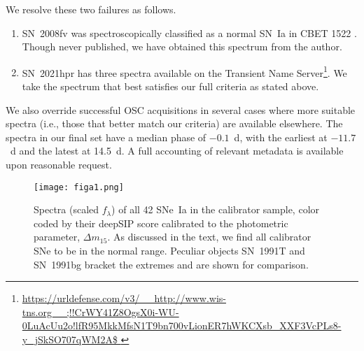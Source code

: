\documentclass[12pt]{aastex631}
\begin{document}
\begin{appendices}
We resolve these two failures as follows.
\begin{enumerate}
\item SN~2008fv was spectroscopically classified as a normal SN~Ia in CBET 1522 \citep{Challis:2008}. Though never published, we have obtained this spectrum from the author.
\item SN~2021hpr has three spectra available on the Transient Name Server\footnote{\url{https://urldefense.com/v3/__http://www.wis-tns.org__;!!CrWY41Z8OgsX0i-WU-0LuAcUu2o!lfR95MkkMfsN1T9bn700vLionER7hWKCXsb_XXF3VcPLs8-y_jSkSO707qWM2A$ }}. We take the spectrum that best satisfies our full criteria as stated above.
\end{enumerate}

We also override successful OSC acquisitions in several cases where more suitable spectra (i.e., those that better match our criteria) are available elsewhere. The spectra in our final set have a median phase of $-0.1$~d, with the earliest at $-11.7$~d and the latest at 14.5~d. A full accounting of relevant metadata is available upon reasonable request.

\begin{figure}[t]
\begin{center}
\texttt{[image: figa1.png]}
\end{center}
\caption{\label{fg:spectra} Spectra (scaled $f_\lambda$) of all 42 SNe~Ia in the calibrator sample, color coded by their deepSIP score calibrated to the photometric parameter, $\Delta m_{15}$.  As discussed in the text, we find all calibrator SNe to be in the normal range. Peculiar objects SN~1991T and SN~1991bg bracket the extremes and are shown for comparison.  }
\end{figure}


\end{appendices}
\end{document}
